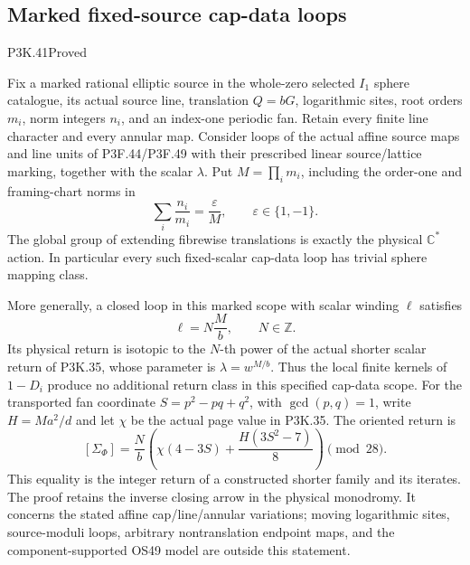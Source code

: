 \subsection{Marked fixed-source cap-data loops}
\begin{statement}{P3K.41}{Proved}

Fix a marked rational elliptic source in the whole-zero selected
\(I_1\) sphere catalogue, its actual source line, translation
\(Q=bG\), logarithmic sites, root orders \(m_i\), norm integers
\(n_i\), and an index-one periodic fan. Retain every finite line
character and every annular map. Consider loops of the actual affine
source maps and line units of P3F.44/P3F.49 with their prescribed
linear source/lattice marking, together with the scalar \(\lambda\).
Put \(M=\prod_i m_i\), including the order-one and framing-chart
norms in
\[
           \sum_i\frac{n_i}{m_i}=\frac{\varepsilon}{M},
                \qquad\varepsilon\in\{1,-1\}.
\]
The global group of extending fibrewise translations is exactly
the physical \(\mathbb C^*\) action. In particular every such
fixed-scalar cap-data loop has trivial sphere mapping class.

More generally, a closed loop in this marked scope with scalar
winding \(\ell\) satisfies
\[
                       \ell=N\frac{M}{b},\qquad N\in\mathbb Z.
\]
Its physical return is isotopic to the \(N\)-th power of the
actual shorter scalar return of P3K.35, whose parameter is
\(\lambda=w^{M/b}\). Thus the local finite kernels of \(1-D_i\)
produce no additional return class in this specified cap-data scope.
For the transported fan coordinate \(S=p^2-pq+q^2\), with
\(\gcd(p,q)=1\), write \(H=Ma^2/d\) and let \(\chi\) be the
actual page value in P3K.35. The oriented return is
\[
 [\Sigma_\Phi]
 =\frac{N}{b}\left(\chi(4-3S)+\frac{H(3S^2-7)}8\right)
                         \pmod{28}.
\]
This equality is the integer return of a constructed shorter family
and its iterates. The proof retains the inverse closing arrow in the
physical monodromy. It concerns the stated affine cap/line/annular
variations; moving logarithmic sites, source-moduli loops, arbitrary
nontranslation endpoint maps, and the component-supported OS49
model are outside this statement.

\end{statement}
